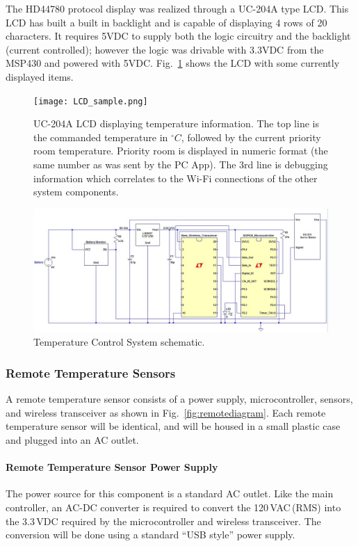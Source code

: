 The HD44780 protocol display was realized through a UC-204A type LCD.  This LCD has built a built in backlight and is capable of displaying 4 rows of 20 characters.  It requires 5VDC to supply both the logic circuitry and the backlight (current controlled); however the logic was drivable with 3.3VDC from the MSP430 and powered with 5VDC. Fig.~\ref{fig:lcd_sample} shows the LCD with some currently displayed items.

\begin{figure}[htbp]
\centering
\texttt{[image: LCD\_sample.png]}
\caption{UC-204A LCD displaying temperature information.  The top line is the commanded temperature in $^\circ C$, followed by the current priority room temperature.  Priority room is displayed in numeric format (the same number as was sent by the PC App).  The 3rd line is debugging information which correlates to the Wi-Fi connections of the other system components. }
\label{fig:lcd_sample}
\end{figure}




\begin{figure}[htbp]
\centering
\includegraphics[width=.99\textwidth]{Temperature_Sensor.JPG}
\caption{Temperature Control System schematic.}
\label{fig:Temperature_System}
\end{figure}


\subsubsection{Remote Temperature Sensors}
A remote temperature sensor consists of a power supply, microcontroller, sensors, and wireless transceiver as shown in Fig.~\ref{fig:remotediagram}.  Each remote temperature sensor will be identical, and will be housed in a small plastic case and plugged into an AC outlet.
\paragraph{Remote Temperature Sensor Power Supply}
The power source for this component is a standard AC outlet.  Like the main controller, an AC-DC converter is required to convert the 120\,VAC\,(RMS) into the 3.3\,VDC required by the microcontroller and wireless transceiver.  The conversion will be done using a standard ``USB style'' power supply.
